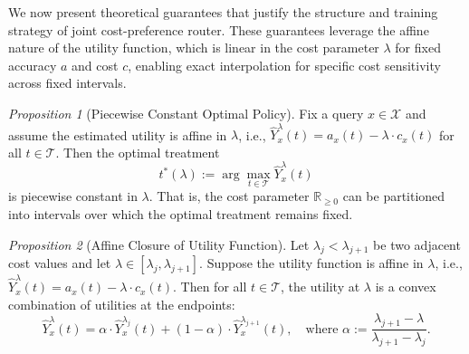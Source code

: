 \documentclass{article}
\theoremstyle{remark}
\newtheorem{proposition}{Proposition}
\begin{document}
We now present theoretical guarantees that justify the structure and training strategy of joint cost-preference router. These guarantees leverage the affine nature of the utility function, %
which is linear in the cost parameter $\lambda$ for fixed accuracy $a$ and cost $c$, enabling exact interpolation for specific cost sensitivity across fixed  intervals.

\begin{proposition}[Piecewise Constant Optimal Policy]
\label{prop:piecewise-policy}
Fix a query $x \in \mathcal{X}$ and assume the estimated utility is affine in $\lambda$, i.e., $\hat{Y}_x^\lambda(t) = a_x(t) - \lambda \cdot c_x(t)$ for all $t \in \mathcal{T}$. Then the optimal treatment
\[
t^*(\lambda) := \arg\max_{t \in \mathcal{T}} \hat{Y}_x^\lambda(t)
\]
is piecewise constant in $\lambda$. That is, the cost parameter $\mathbb{R}_{\geq 0}$ can be partitioned into intervals over which the optimal treatment remains fixed.
\end{proposition}


\begin{proposition}[Affine Closure of Utility Function]
\label{prop:affine-closure}
Let $\lambda_j < \lambda_{j+1}$ be two adjacent cost values and let $\lambda \in [\lambda_j, \lambda_{j+1}]$. Suppose the utility function is affine in $\lambda$, i.e., $\hat{Y}_x^\lambda(t) = a_x(t) - \lambda \cdot c_x(t).$ Then for all $t \in \mathcal{T}$, the utility at $\lambda$ is a convex combination of utilities at the endpoints:
\[
\hat{Y}_x^\lambda(t) = \alpha \cdot \hat{Y}_x^{\lambda_j}(t) + (1 - \alpha) \cdot \hat{Y}_x^{\lambda_{j+1}}(t),
\quad \text{where } \alpha := \frac{\lambda_{j+1} - \lambda}{\lambda_{j+1} - \lambda_j}.
\]
\end{proposition}
\end{document}
